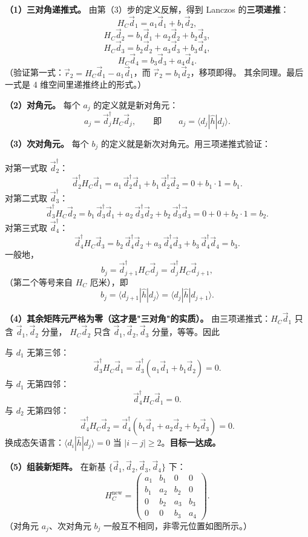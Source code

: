 \documentclass[11pt]{ctexart}
\begin{document}
\textbf{（1）三对角递推式。}
由第（3）步的定义反解，得到 Lanczos 的\textbf{三项递推}：
\[
H_C\vec d_1=a_1\vec d_1+b_1\vec d_2 ,
\]
\[
H_C\vec d_2=b_1\vec d_1+a_2\vec d_2+b_2\vec d_3 ,
\]
\[
H_C\vec d_3=b_2\vec d_2+a_3\vec d_3+b_3\vec d_4 ,
\]
\[
H_C\vec d_4=b_3\vec d_3+a_4\vec d_4 .
\]
（验证第一式：$\vec r_2=H_C\vec d_1-a_1\vec d_1$，而 $\vec r_2=b_1\vec d_2$，移项即得。
其余同理。最后一式是 4 维空间里递推终止的形式。）

\textbf{（2）对角元。}
每个 $a_j$ 的定义就是新对角元：
\[
a_j=\vec d_j^{\dagger}H_C\vec d_j,
\qquad\text{即}\qquad
a_j=\langle d_j|\hat h|d_j\rangle .
\]

\textbf{（3）次对角元。}
每个 $b_j$ 的定义就是新次对角元。用三项递推式验证：

对第一式取 $\vec d_2^{\dagger}$：
\[
\vec d_2^{\dagger}H_C\vec d_1
=
a_1\,\vec d_2^{\dagger}\vec d_1+b_1\,\vec d_2^{\dagger}\vec d_2
=
0+b_1\cdot1
=
b_1 .
\]
对第二式取 $\vec d_3^{\dagger}$：
\[
\vec d_3^{\dagger}H_C\vec d_2
=
b_1\,\vec d_3^{\dagger}\vec d_1+a_2\,\vec d_3^{\dagger}\vec d_2+b_2\,\vec d_3^{\dagger}\vec d_3
=
0+0+b_2\cdot1
=
b_2 .
\]
对第三式取 $\vec d_4^{\dagger}$：
\[
\vec d_4^{\dagger}H_C\vec d_3
=
b_2\,\vec d_4^{\dagger}\vec d_2+a_3\,\vec d_4^{\dagger}\vec d_3+b_3\,\vec d_4^{\dagger}\vec d_4
=
b_3 .
\]
一般地，
\[
b_j=\vec d_{j+1}^{\dagger}H_C\vec d_j=\vec d_j^{\dagger}H_C\vec d_{j+1},
\]
（第二个等号来自 $H_C$ 厄米），即
\[
b_j=\langle d_{j+1}|\hat h|d_j\rangle=\langle d_j|\hat h|d_{j+1}\rangle .
\]

\textbf{（4）其余矩阵元严格为零（这才是"三对角"的实质）。}
由三项递推式：$H_C\vec d_1$ 只含 $\vec d_1,\vec d_2$ 分量，
$H_C\vec d_2$ 只含 $\vec d_1,\vec d_2,\vec d_3$ 分量，等等。因此

与 $d_1$ 无第三邻：
\[
\vec d_3^{\dagger}H_C\vec d_1
=
\vec d_3^{\dagger}(a_1\vec d_1+b_1\vec d_2)
=
0 .
\]
与 $d_1$ 无第四邻：
\[
\vec d_4^{\dagger}H_C\vec d_1
=
0 .
\]
与 $d_2$ 无第四邻：
\[
\vec d_4^{\dagger}H_C\vec d_2
=
\vec d_4^{\dagger}(b_1\vec d_1+a_2\vec d_2+b_2\vec d_3)
=
0 .
\]
换成态矢语言：$\langle d_i|\hat h|d_j\rangle=0$ 当 $|i-j|\ge2$。\textbf{目标一达成。}

\textbf{（5）组装新矩阵。}
在新基 $\{\vec d_1,\vec d_2,\vec d_3,\vec d_4\}$ 下：
\[
H_C^{\mathrm{new}}
=
\begin{pmatrix}
a_1 & b_1 & 0 & 0\\
b_1 & a_2 & b_2 & 0\\
0 & b_2 & a_3 & b_3\\
0 & 0 & b_3 & a_4
\end{pmatrix} .
\]
（对角元 $a_j$、次对角元 $b_j$ 一般互不相同，非零元位置如图所示。）
\end{document}
